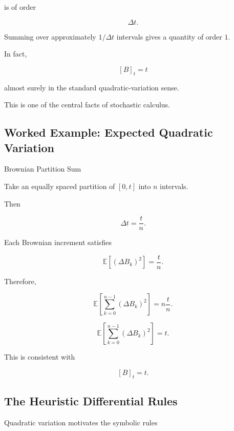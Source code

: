 is of order

\[
\Delta t.
\]

Summing over approximately \(1/\Delta t\) intervals gives a quantity of
order \(1\).

In fact,

\[
\boxed{
[B]_t=t
}
\]

almost surely in the standard quadratic-variation sense.

This is one of the central facts of stochastic calculus.

\subsection{Worked Example: Expected Quadratic Variation}
\label{subsec:worked-expected-qv}

\begin{workedexamplebox}{Brownian Partition Sum}

Take an equally spaced partition of \([0,t]\) into \(n\) intervals.

Then

\[
\Delta t
=
\frac{t}{n}.
\]

Each Brownian increment satisfies

\[
\mathbb{E}
[
(\Delta B_k)^2
]
=
\frac{t}{n}.
\]

Therefore,

\[
\mathbb{E}
\left[
\sum_{k=0}^{n-1}
(\Delta B_k)^2
\right]
=
n\frac{t}{n}.
\]

\begin{answerbox}
\[
\boxed{
\mathbb{E}
\left[
\sum_{k=0}^{n-1}
(\Delta B_k)^2
\right]
=
t.
}
\]
\end{answerbox}

This is consistent with

\[
[B]_t=t.
\]

\end{workedexamplebox}

\subsection{The Heuristic Differential Rules}
\label{subsec:ito-differential-rules}

Quadratic variation motivates the symbolic rules

